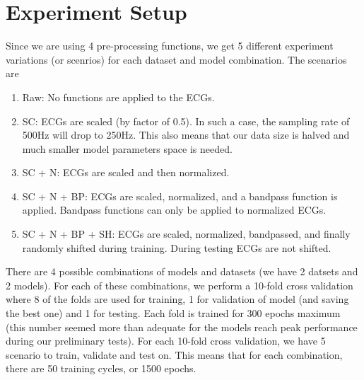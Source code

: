 \documentclass{article}
\begin{document}
    


\section{Experiment Setup}
Since we are using 4 pre-processing functions, we get 5 different experiment variations (or scenrios) for each dataset and model combination. The scenarios are \begin{enumerate}
  \item Raw: No functions are applied to the ECGs.
  \item SC: ECGs are scaled (by factor of 0.5). In such a case, the sampling rate of 500Hz will drop to 250Hz. This also means that our data size is halved and much smaller model parameters space is needed.
  \item SC + N: ECGs are scaled and then normalized.
  \item SC + N + BP: ECGs are scaled, normalized, and a bandpass function is applied. Bandpass functions can only be applied to normalized ECGs.
  \item SC + N + BP + SH: ECGs are scaled, normalized, bandpassed, and finally randomly shifted during training. During testing ECGs are not shifted. 
\end{enumerate}
There are 4 possible combinations of models and datasets (we have 2 datsets and 2 models). For each of these combinations, we perform a 10-fold cross validation where 8 of the folds are used for training, 1 for validation of model (and saving the best one) and 1 for testing. Each fold is trained for 300 epochs maximum (this number seemed more than adequate for the models reach peak performance during our preliminary tests). For each 10-fold cross validation, we have 5 scenario to train, validate and test on. This means that for each combination, there are 50 training cycles, or 1500 epochs. 
\end{document}
